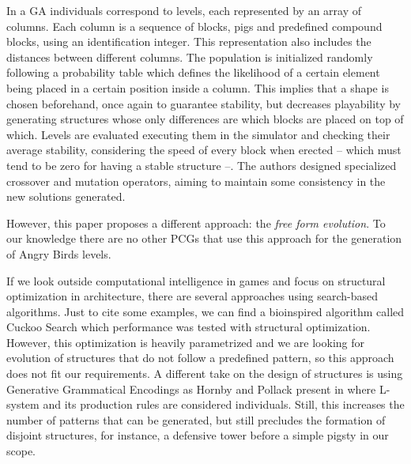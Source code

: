 \documentclass[sigconf]{acmart}
\begin{document}
In a GA individuals correspond to levels, each represented by an array
of columns. Each column is a sequence of blocks, pigs and predefined
compound blocks, using an identification integer. This representation
also includes the distances between different columns. The population
is initialized randomly following a probability table which defines
the likelihood of a certain element being placed in a certain position
inside a column. This implies that a shape is chosen beforehand, once
again to guarantee stability, but decreases playability by generating
structures whose only differences are which blocks are placed on top
of which.  Levels are evaluated executing them in the simulator and
checking their average stability, considering the speed of every block
when erected -- which must tend to be zero for having a stable
structure --. The authors designed specialized crossover and mutation
operators, aiming to maintain some consistency in the new solutions
generated.

However, this paper proposes a different approach: the \textit{free
  form evolution}. To our knowledge there are no other PCGs that
use this approach for the generation of Angry Birds levels. 

If we look outside computational intelligence in games and focus on 
structural optimization in architecture, there are several approaches using 
search-based
algorithms. Just to cite some examples, we can find a bioinspired algorithm 
called Cuckoo Search \cite{gandomi2013cuckoo}
which performance was tested with structural optimization. However, this 
optimization is heavily parametrized
and we are looking for evolution of structures that do not follow a predefined 
pattern, so this approach does not fit our requirements. A different take on 
the design of structures is using Generative Grammatical 
Encodings as Hornby and Pollack present in \cite{hornby2001advantages} where 
L-system
and its production rules are considered individuals. Still, this increases the
number of patterns that can be generated, but still precludes the formation 
of disjoint structures, for instance, a defensive tower before a simple pigsty 
in our scope.
\end{document}
